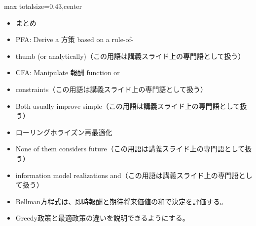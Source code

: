 \clearpage
{}
\begin{minipage}[t]{0.405\textwidth}
\begin{adjustbox}{max totalsize={\textwidth}{0.43\textheight},center}
\begin{minipage}{\textwidth}\scriptsize
{}\begin{itemize}
\item まとめ
\item PFA: Derive a 方策 based on a rule-of-
\item thumb (or analytically)（この用語は講義スライド上の専門語として扱う）
\item CFA: Manipulate 報酬 function or
\item constraints（この用語は講義スライド上の専門語として扱う）
\item Both usually improve simple（この用語は講義スライド上の専門語として扱う）
\item ローリングホライズン再最適化
\item None of them considers future（この用語は講義スライド上の専門語として扱う）
\item information model realizations and（この用語は講義スライド上の専門語として扱う）
\end{itemize}\begin{itemize}
\item Bellman方程式は、即時報酬と期待将来価値の和で決定を評価する。
\item Greedy政策と最適政策の違いを説明できるようにする。
\end{itemize}
\end{minipage}
\end{adjustbox}
\end{minipage}\hfill
